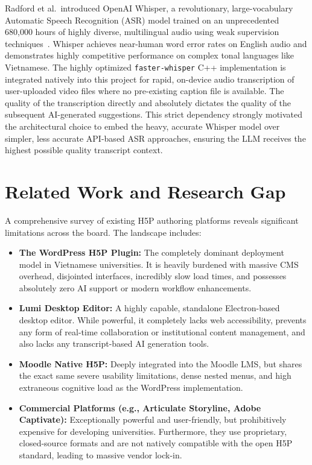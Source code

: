 Radford et al.\ introduced OpenAI Whisper, a revolutionary, large-vocabulary Automatic Speech Recognition (ASR) model trained on an unprecedented 680,000 hours of highly diverse, multilingual audio using weak supervision techniques~\cite{radford2023}. Whisper achieves near-human word error rates on English audio and demonstrates highly competitive performance on complex tonal languages like Vietnamese. The highly optimized \texttt{faster-whisper} C++ implementation is integrated natively into this project for rapid, on-device audio transcription of user-uploaded video files where no pre-existing caption file is available. The quality of the transcription directly and absolutely dictates the quality of the subsequent AI-generated suggestions. This strict dependency strongly motivated the architectural choice to embed the heavy, accurate Whisper model over simpler, less accurate API-based ASR approaches, ensuring the LLM receives the highest possible quality transcript context.

\section{Related Work and Research Gap}

A comprehensive survey of existing H5P authoring platforms reveals significant limitations across the board. The landscape includes:
\begin{itemize}
    \item \textbf{The WordPress H5P Plugin:} The completely dominant deployment model in Vietnamese universities. It is heavily burdened with massive CMS overhead, disjointed interfaces, incredibly slow load times, and possesses absolutely zero AI support or modern workflow enhancements.
    \item \textbf{Lumi Desktop Editor:} A highly capable, standalone Electron-based desktop editor. While powerful, it completely lacks web accessibility, prevents any form of real-time collaboration or institutional content management, and also lacks any transcript-based AI generation tools.
    \item \textbf{Moodle Native H5P:} Deeply integrated into the Moodle LMS, but shares the exact same severe usability limitations, dense nested menus, and high extraneous cognitive load as the WordPress implementation.
    \item \textbf{Commercial Platforms (e.g., Articulate Storyline, Adobe Captivate):} Exceptionally powerful and user-friendly, but prohibitively expensive for developing universities. Furthermore, they use proprietary, closed-source formats and are not natively compatible with the open H5P standard, leading to massive vendor lock-in.
\end{itemize}

